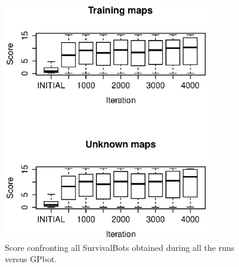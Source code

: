 \documentclass[conference]{IEEEtran}
\begin{document}
\begin{figure}[htb]
\tiny
\begin{center}
\includegraphics[clip=true,width=9cm]{./imags/score_vs_gpbot.eps}
\end{center}
\caption{Score confronting all SurvivalBots obtained during all the runs versus GPbot.}
\label{figura:Score_VS_GPBot}
\end{figure}





\end{document}
